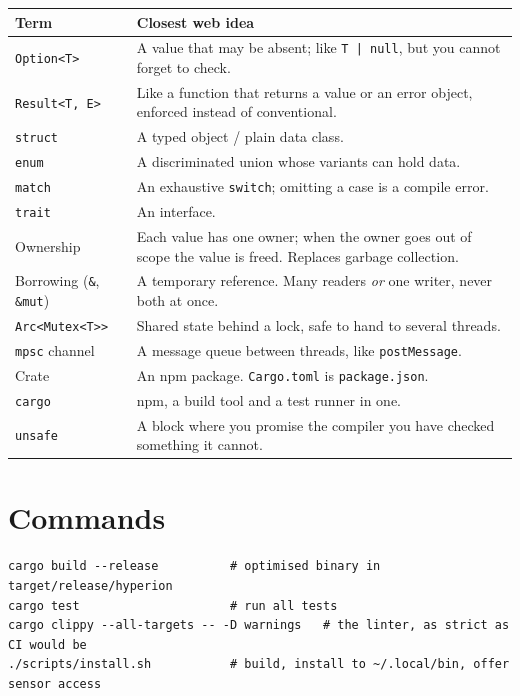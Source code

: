 \documentclass[11pt,a4paper]{article}
\newcommand{\code}[1]{\texttt{#1}}
\begin{document}
\begin{center}
\small
\begin{tabular}{@{}p{3.4cm}p{11.4cm}@{}}
\toprule
Term & Closest web idea \\
\midrule
\code{Option<T>} & A value that may be absent; like \code{T | null}, but you cannot forget to check. \\
\code{Result<T, E>} & Like a function that returns a value or an error object, enforced instead of conventional. \\
\code{struct} & A typed object / plain data class. \\
\code{enum} & A discriminated union whose variants can hold data. \\
\code{match} & An exhaustive \code{switch}; omitting a case is a compile error. \\
\code{trait} & An interface. \\
Ownership & Each value has one owner; when the owner goes out of scope the value is freed. Replaces garbage collection. \\
Borrowing (\code{\&}, \code{\&mut}) & A temporary reference. Many readers \emph{or} one writer, never both at once. \\
\code{Arc<Mutex<T>>} & Shared state behind a lock, safe to hand to several threads. \\
\code{mpsc} channel & A message queue between threads, like \code{postMessage}. \\
Crate & An npm package. \code{Cargo.toml} is \code{package.json}. \\
\code{cargo} & npm, a build tool and a test runner in one. \\
\code{unsafe} & A block where you promise the compiler you have checked something it cannot. \\
\bottomrule
\end{tabular}
\end{center}

\section{Commands}

\begin{lstlisting}[language={}]
cargo build --release          # optimised binary in target/release/hyperion
cargo test                     # run all tests
cargo clippy --all-targets -- -D warnings   # the linter, as strict as CI would be
./scripts/install.sh           # build, install to ~/.local/bin, offer sensor access
\end{lstlisting}
\end{document}
